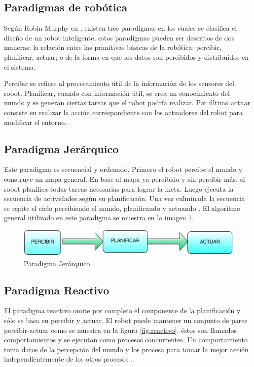    
\subsection*{Paradigmas de robótica}
Según Robin Murphy en \cite{AiRobotics}, existen tres paradigmas en los cuales se clasifica el diseño de un robot inteligente, estos paradigmas pueden ser descritos de dos maneras: la relación entre las primitivas básicas de la robótica:  percibir, planificar, actuar; o de la forma en que los datos son percibidos y distribuidos en el sistema.

Percibir se refiere al procesamiento útil de la información de los sensores del robot. Planificar, cuando con información útil, se crea un conocimiento del mundo y se generan ciertas tareas que el robot podría realizar. Por último actuar consiste en realizar la acción correspondiente con los actuadores del robot para modificar el entorno. 

\subsection{Paradigma Jerárquico}

Este paradigma es secuencial y ordenado. Primero el robot percibe el mundo y construye un mapa general. En base al mapa ya percibido y sin percibir m\'as, el robot planifica todas tareas necesarias para lograr la meta. Luego ejecuta la secuencia de actividades según su planificaci\'on. Una vez culminada la secuencia se repite el ciclo percibiendo el mundo, planificando y actuando \cite{AiRobotics}. El algoritmo general utilizado en este paradigma se muestra en la imagen \ref{fig:jerarquico}.

\begin{figure}[hbtp]

\centering
\includegraphics[scale=0.7]{imagenes/jerarquico.png} 
\caption{Paradigma Jer\'arquico}
\label{fig:jerarquico}
\end{figure}


\subsection{Paradigma Reactivo}
El paradigma reactivo omite por completo el componente de la planificación y s\'olo se basa en percibir y actuar. El robot puede mantener un conjunto de pares percibir-actuar como se muestra en la figura \ref{fig:reactivo}, \'estos son llamados comportamientos y se ejecutan como procesos concurrentes. Un comportamiento toma datos de la percepción del mundo y los procesa para tomar la mejor acción independientemente de los otros procesos \cite{AiRobotics}.

